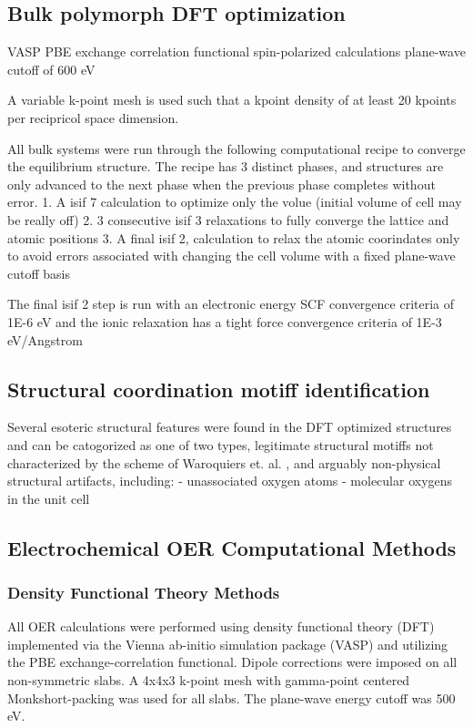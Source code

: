 \subsection{Bulk polymorph DFT optimization}
VASP
PBE exchange correlation functional
spin-polarized calculations
plane-wave cutoff of 600 eV

A variable k-point mesh is used such that a kpoint density of at least 20 kpoints per recipricol space dimension.

All bulk systems were run through the following computational recipe to converge the equilibrium structure.
The recipe has 3 distinct phases, and structures are only advanced to the next phase when the previous phase completes without error.
1. A isif 7 calculation to optimize only the volue (initial volume of cell may be really off)
2. 3 consecutive isif 3 relaxations to fully converge the lattice and atomic positions
3. A final isif 2, calculation to relax the atomic coorindates only to avoid errors associated with changing the cell volume with a fixed plane-wave cutoff basis

The final isif 2 step is run with an electronic energy SCF convergence criteria of 1E-6 eV and the ionic relaxation has a tight force convergence criteria of 1E-3 eV/Angstrom

\subsection{Structural coordination motiff identification}
Several esoteric structural features were found in the DFT optimized structures and can be catogorized as one of two types, legitimate structural motiffs not characterized by the scheme of Waroquiers et. al. \cite{Waroquiers2017}, and arguably non-physical structural artifacts, including:
- unassociated oxygen atoms
- molecular oxygens in the unit cell
%

\subsection{Electrochemical OER Computational Methods}  %

\subsubsection{Density Functional Theory Methods}
All OER calculations were performed using density functional theory (DFT) implemented via the Vienna ab-initio simulation package (VASP) and utilizing the PBE exchange-correlation functional.
Dipole corrections were imposed on all non-symmetric slabs.
A 4x4x3 k-point mesh with gamma-point centered Monkshort-packing was used for all slabs.
The plane-wave energy cutoff was 500 eV.

